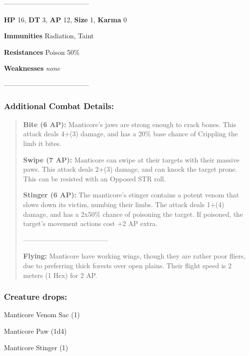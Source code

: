 \documentclass[11pt,a4paper,twocolumn]{book}
\begin{document}
	--------------------------------------
	
	\noindent
	\textbf{HP} 16, \textbf{DT} 3, \textbf{AP} 12, \textbf{Size} 1, \textbf{Karma} 0
	
	
	\noindent
	\textbf{Immunities} Radiation, Taint%
	
	\noindent
	\textbf{Resistances} Poison 50\%%
	
	\noindent
	\textbf{Weaknesses} \emph{none}%
	
	--------------------------------------
	
	\subsubsection*{Additional Combat Details:}
	\begin{verse}
		\textbf{Bite (6 AP):} Manticore's jaws are strong enough to crack bones. This attack deals 4+(3) damage, and has a 20\% base chance of Crippling the limb it bites.
		
		\textbf{Swipe (7 AP):} Manticore can swipe at their targets with their massive paws. This attack deals 2+(3) damage, and can knock the target prone. This can be resisted with an Opposed STR roll.
		
		\textbf{Stinger (6 AP):} The manticore's stinger contains a potent venom that slows down its victim, numbing their limbs. The attack deals 1+(4) damage, and has a 2x50\% chance of poisoning the target. If poisoned, the target's movement actions cost +2 AP extra.
		
		--------------------------------------
		
		\textbf{Flying:} Manticore have working wings, though they are rather poor fliers, due to preferring thick forests over open plains. Their flight speed is 2 meters (1 Hex) for 2 AP.

	\end{verse}
	
	\subsubsection*{Creature drops:}
	\begin{compactitem}
		\item Manticore Venom Sac (1)
		\item Manticore Paw (1d4)
		\item Manticore Stinger (1)
	\end{compactitem}
	
\end{document}
